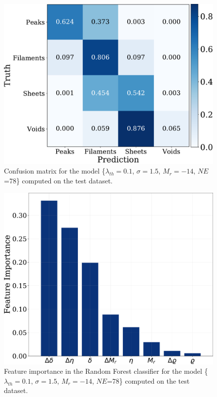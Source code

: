 \documentclass[usenatbib]{mnras}
\begin{document}
\begin{figure}
\centering
    \includegraphics[scale=0.35]{Figs/p_confusion_matrix_valid.pdf}
\caption{Confusion matrix for the model 
      \{$\lambda_{th}=0.1$, $\sigma=1.5$, $M_r=-14$,
      $NE$=78\} computed on the test dataset.}
      \label{fig:confusion_matrix}
\end{figure}

\begin{figure}
    \includegraphics[scale=0.29]{Figs/p_features_importance_valid.pdf}  
    \caption{
      Feature importance in the Random Forest classifier for the model
      \{$\lambda_{th}=0.1$, $\sigma=1.5$, $M_r=-14$,
      $NE$=78\} computed on the test dataset.}
    \label{fig:feature_importance}
\end{figure}
\end{document}
